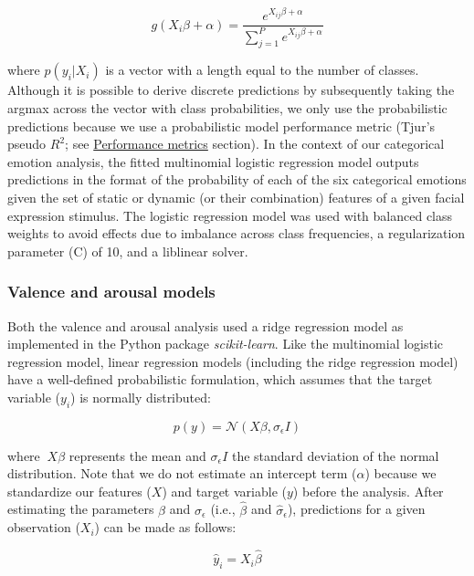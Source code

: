 \documentclass[12pt,american,a4paper,oneside,]{memoir} %
\begin{document}
\begin{equation}
g(X_{i}\beta + \alpha) = \frac{e^{X_{ij}\beta + \alpha}}{\sum_{j=1}^{P}e^{X_{ij}\beta + \alpha}}
\end{equation}

where \(p(y_{i} | X_{i})\) is a vector with a length equal to the number of classes. Although it is possible to derive discrete predictions by subsequently taking the argmax across the vector with class probabilities, we only use the probabilistic predictions because we use a probabilistic model performance metric (Tjur's pseudo \(R^{2}\); see \protect\hyperlink{svsd-perf}{Performance metrics} section). In the context of our categorical emotion analysis, the fitted multinomial logistic regression model outputs predictions in the format of the probability of each of the six categorical emotions given the set of static or dynamic (or their combination) features of a given facial expression stimulus. The logistic regression model was used with balanced class weights to avoid effects due to imbalance across class frequencies, a regularization parameter (C) of 10, and a liblinear solver.

\hypertarget{svsd-valaro}{%
\subsubsection{Valence and arousal models}\label{svsd-valaro}}

Both the valence and arousal analysis used a ridge regression model as implemented in the Python package \emph{scikit-learn}. Like the multinomial logistic regression model, linear regression models (including the ridge regression model) have a well-defined probabilistic formulation, which assumes that the target variable (\(y_{i}\)) is normally distributed:

\begin{equation}
p(y) = \mathcal{N}(X\beta, \sigma_{\epsilon}I)
\end{equation}

where \(~X\beta\) represents the mean and \(\sigma_{\epsilon}I\) the standard deviation of the normal distribution. Note that we do not estimate an intercept term (\(\alpha\)) because we standardize our features (\(X\)) and target variable (\(y\)) before the analysis. After estimating the parameters \(\beta\) and \(\sigma_{\epsilon}\) (i.e., \(\hat{\beta}\) and \(\hat{\sigma}_{\epsilon}\)), predictions for a given observation (\(X_{i}\)) can be made as follows:

\begin{equation}
\hat{y}_{i} = X_{i}\hat{\beta}
\end{equation}
\end{document}
